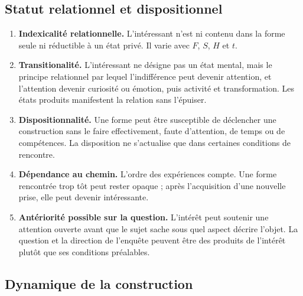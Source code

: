 \documentclass[11pt,a4paper]{article}
\begin{document}
\subsection{Statut relationnel et dispositionnel}

\begin{enumerate}
  \item \textbf{Indexicalité relationnelle.} L'intéressant n'est ni contenu
        dans la forme seule ni réductible à un état privé. Il varie avec
        \(F\), \(S\), \(H\) et \(t\).
  \item \textbf{Transitionalité.} L'intéressant ne désigne pas un état mental,
        mais le principe relationnel par lequel l'indifférence peut devenir
        attention, et l'attention devenir curiosité ou émotion, puis activité et
        transformation. Les états produits manifestent la relation sans
        l'épuiser.
  \item \textbf{Dispositionnalité.} Une forme peut être susceptible de
        déclencher une construction sans le faire effectivement, faute
        d'attention, de temps ou de compétences. La disposition ne s'actualise
        que dans certaines conditions de rencontre.
  \item \textbf{Dépendance au chemin.} L'ordre des expériences compte. Une
        forme rencontrée trop tôt peut rester opaque ; après l'acquisition
        d'une nouvelle prise, elle peut devenir intéressante.
  \item \textbf{Antériorité possible sur la question.} L'intérêt peut soutenir
        une attention ouverte avant que le sujet sache sous quel aspect décrire
        l'objet. La question et la direction de l'enquête peuvent être des
        produits de l'intérêt plutôt que ses conditions préalables.
\end{enumerate}

\subsection{Dynamique de la construction}
\end{document}
